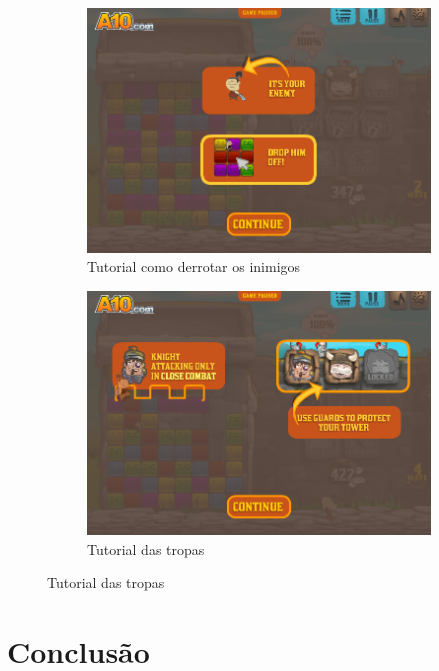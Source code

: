 \documentclass[12pt]{article}
\begin{document}
\begin{figure}[h]
\begin{subfigure}{0.5\textwidth}
\includegraphics[scale=0.3]{imagens/tutorialoquefazer.png}
\caption{Tutorial como derrotar os inimigos}
\label{fig:tutorialoquefazer}
\end{subfigure}
\begin{subfigure}{0.5\textwidth}
\includegraphics[scale=0.3]{imagens/tutorialsoldado.png} 
\caption{Tutorial das tropas}
\label{fig:tutorialsoldado}
\end{subfigure}
\end{figure}

\section{Conclusão}
\end{document}
